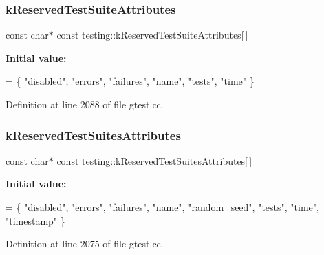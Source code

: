 \subsubsection{\texorpdfstring{k\+Reserved\+Test\+Suite\+Attributes}{kReservedTestSuiteAttributes}}
{\footnotesize\ttfamily const char$\ast$ const testing\+::k\+Reserved\+Test\+Suite\+Attributes\mbox{[}$\,$\mbox{]}\hspace{0.3cm}{\ttfamily [static]}}

{\bfseries Initial value\+:}
\begin{DoxyCode}
= \{
  \textcolor{stringliteral}{"disabled"},
  \textcolor{stringliteral}{"errors"},
  \textcolor{stringliteral}{"failures"},
  \textcolor{stringliteral}{"name"},
  \textcolor{stringliteral}{"tests"},
  \textcolor{stringliteral}{"time"}
\}
\end{DoxyCode}


Definition at line 2088 of file gtest.\+cc.

\mbox{\label{namespacetesting_afa194c15a2ac0e03029019b0f4029968}} 
\subsubsection{\texorpdfstring{k\+Reserved\+Test\+Suites\+Attributes}{kReservedTestSuitesAttributes}}
{\footnotesize\ttfamily const char$\ast$ const testing\+::k\+Reserved\+Test\+Suites\+Attributes\mbox{[}$\,$\mbox{]}\hspace{0.3cm}{\ttfamily [static]}}

{\bfseries Initial value\+:}
\begin{DoxyCode}
= \{
  \textcolor{stringliteral}{"disabled"},
  \textcolor{stringliteral}{"errors"},
  \textcolor{stringliteral}{"failures"},
  \textcolor{stringliteral}{"name"},
  \textcolor{stringliteral}{"random\_seed"},
  \textcolor{stringliteral}{"tests"},
  \textcolor{stringliteral}{"time"},
  \textcolor{stringliteral}{"timestamp"}
\}
\end{DoxyCode}


Definition at line 2075 of file gtest.\+cc.

\mbox{\label{namespacetesting_a5f76dfdb8cb2664da54e320ecaba3643}} 
